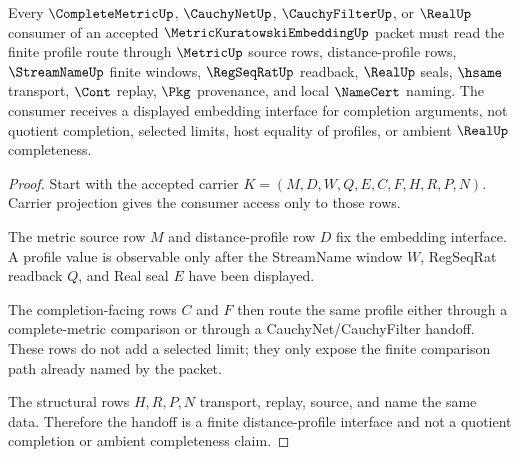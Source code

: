 \begin{theorem}
\label{thm:metric-kuratowski-embedding-completion-route}
Every $\CompleteMetricUp$, $\CauchyNetUp$, $\CauchyFilterUp$, or $\RealUp$ consumer of an accepted $\MetricKuratowskiEmbeddingUp$ packet must read the finite profile route through $\MetricUp$ source rows, distance-profile rows, $\StreamNameUp$ finite windows, $\RegSeqRatUp$ readback, $\RealUp$ seals, $\hsame$ transport, $\Cont$ replay, $\Pkg$ provenance, and local $\NameCert$ naming. The consumer receives a displayed embedding interface for completion arguments, not quotient completion, selected limits, host equality of profiles, or ambient $\RealUp$ completeness.
\end{theorem}
\begin{proof}
Start with the accepted carrier $K=(M,D,W,Q,E,C,F,H,R,P,N)$. Carrier projection gives the consumer access only to those rows.

The metric source row $M$ and distance-profile row $D$ fix the embedding interface. A profile value is observable only after the StreamName window $W$, RegSeqRat readback $Q$, and Real seal $E$ have been displayed.

The completion-facing rows $C$ and $F$ then route the same profile either through a complete-metric comparison or through a CauchyNet/CauchyFilter handoff. These rows do not add a selected limit; they only expose the finite comparison path already named by the packet.

The structural rows $H,R,P,N$ transport, replay, source, and name the same data. Therefore the handoff is a finite distance-profile interface and not a quotient completion or ambient completeness claim.
\end{proof}



